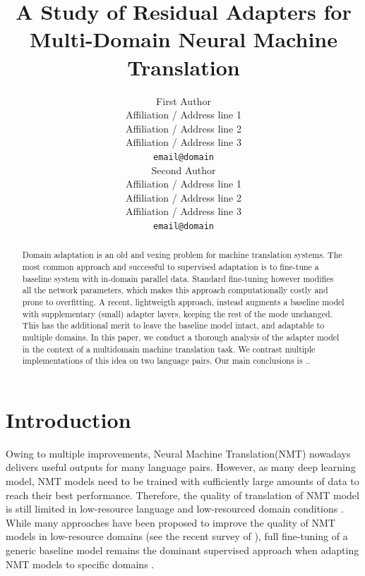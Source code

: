 \documentclass[11pt,a4paper]{article}
\title{A Study of Residual Adapters for Multi-Domain Neural Machine Translation}
\author{First Author \\
  Affiliation / Address line 1 \\
  Affiliation / Address line 2 \\
  Affiliation / Address line 3 \\
  \texttt{email@domain} \\\And
  Second Author \\
  Affiliation / Address line 1 \\
  Affiliation / Address line 2 \\
  Affiliation / Address line 3 \\
  \texttt{email@domain} \\}
\date{}
\newcommand{\fyTodo}[1]{\Todo[FY:]{\textcolor{orange}{#1}}}
\newcommand{\fyDone}[1]{\done[FY]\Todo[FY:]{\textcolor{orange}{#1}}}
\newcommand{\mpTodo}[1]{\Todo[MP:]{\textcolor{green}{#1}}}
\begin{document}
\maketitle
\begin{abstract}
\fyDone{Citation-free abstract}
Domain adaptation is an old and vexing problem for machine translation systems. The most common approach and successful to supervised adaptation is to fine-tune a baseline system with in-domain parallel data. Standard fine-tuning however modifies all the network parameters, which makes this approach computationally costly and prone to overfitting. A recent, lightweigth approach, instead augments a baseline model with supplementary (small) adapter layers, keeping the rest of the mode unchanged. This has the additional merit to leave the baseline model intact, and adaptable to multiple domains. In this paper, we conduct a thorough analysis of the adapter model in the context of a multidomain machine translation task. We contrast multiple implementations of this idea on two language pairs. Our main conclusions is ..\fyTodo{abstract to be continued}

\end{abstract}
\section{Introduction } \label{sec:intro}
\mpTodo{write introduction} \fyDone{Citations in chronological order}\fyDone{Split long sentences}
Owing to multiple improvements, Neural Machine Translation(NMT) \cite{Kalchbrenner13recurrent,Sutskever14sequence,Bahdanau15learning,Vaswani17attention} nowadays delivers useful outputs for many language pairs. However, as many deep learning model, NMT models need to be trained with sufficiently large amounts of data to reach their best performance. Therefore, the quality of translation of NMT model is still limited in low-resource language and low-resourced domain conditions \cite{duh13adaptation,zoph16transfer,koehn17six}. While many approaches have been proposed to improve the quality of NMT models in low-resource domains (see the recent survey of \citet{Chu18asurvey}), full fine-tuning of a generic baseline model remains the dominant supervised approach when adapting NMT models to specific domains \cite{Luong15stanford,neubig18rapid}.
\end{document}
